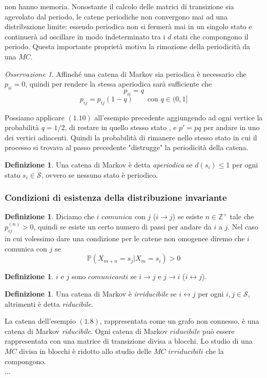 \documentclass{article}
\theoremstyle{definition}
\newtheorem{definition}[theorem]{Definizione}
\theoremstyle{remark}
\newtheorem{remark}[theorem]{Osservazione}
\begin{document}
non hanno memoria.
Nonostante il calcolo delle matrici di transizione sia agevolato dal periodo, le catene periodiche non convergono mai
ad una distribuzione limite: essendo periodica non si fermerà mai in un singolo stato e continuerà ad oscillare
in modo indeterminato tra i $d$ stati  che compongono il periodo. Questa importante proprietà motiva la rimozione della
periodicità da una $MC$.
\begin{remark}
    Affinché una catena di Markov sia periodica è necessario che $p_{ii} = 0$, quindi per rendere la stessa aperiodica sarà sufficiente che
    $$p_{ii} = q$$
    $$p_{ij} = p_{ij}(1-q) \qquad \text{con $q\in(0,1]$}$$
\end{remark}
Possiamo applicare $(1.10)$ all'esempio precedente aggiungendo ad ogni vertice la probabilità $q=1/2$, di restare in quello stesso stato , e $p' = pq$ per andare in uno dei vertici adiacenti.
Quindi la probabilità di rimanere nello stesso stato in cui il processo si trovava al passo precedente "distrugge" la periodicità della catena.
\begin{definition}
    Una catena di Markov è detta \textit{aperiodica} se $d(s_i)\le 1$ per ogni stato $s_i\in\mathcal{S}$, ovvero se nessuno stato è periodico.
\end{definition}
\subsubsection{Condizioni di esistenza della distribuzione invariante}
\begin{definition}
    Diciamo che $i$ $comunica$ con $j$ ($i\to j$) se esiste $n\in \mathbb{Z}^+$ tale che $p^{(n)}_{ij}>0$, quindi se esiste un certo numero di passi
    per andare da $i$ a $j$. Nel caso in cui volessimo dare una condizione per le catene non omogenee diremo che $i$ comunica con $j$ se $$\mathbb{P}(X_{m+n}=s_j|X_{m} =s_i)>0$$
\end{definition}
\begin{definition}
    $i$ e $j$ sono $comunicanti$ se $i\to j$ e $j\to i$ ($i\longleftrightarrow j$).
\end{definition}
\begin{definition}
    Una catena di Markov è \textit{irriducibile} se $i\longleftrightarrow  j$ per ogni $i,j\in \mathcal{S}$, altrimenti è detta \textit{riducibile}.
\end{definition}
La catena dell'esempio $\mathbf{(1.8)}$, rappresentata come un grafo non connesso, è una catena di Markov \textit{riducibile}. Ogni catena di Markov $riducibile$
può essere rappresentata con una matrice di transizione divisa a blocchi. Lo studio di una $MC$ divisa in blocchi è ridotto allo studio delle $MC$ $irriducibili$ che la compongono.\\
...
\end{document}
